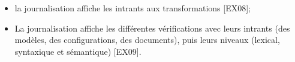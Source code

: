 {\begin{itemize}
\begin{itemize}
        \item la journalisation affiche les intrants aux transformations [EX08];

        \item La journalisation affiche les différentes vérifications avec leurs intrants (des modèles, des configurations, des documents), puis leurs niveaux (lexical, syntaxique et sémantique) [EX09].
    \end{itemize}
\end{itemize}
\leavevmode\vspace{-\baselineskip}
}{}{}

